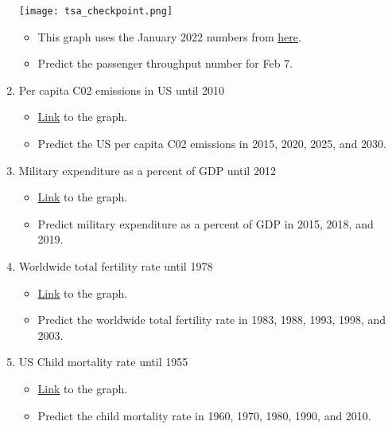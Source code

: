 \documentclass[11pt]{article}
\begin{document}
\begin{enumerate}
	\begin{center}	
		\texttt{[image: tsa\_checkpoint.png]}
	\end{center}

	\begin{itemize}
		\item This graph uses the January 2022 numbers from \href{https://www.tsa.gov/coronavirus/passenger-throughput}{here}.
		\item Predict the passenger throughput number for Feb 7.
	\end{itemize}
	
	\item Per capita C02 emissions in US until 2010
	\begin{itemize}
		\item \href{https://ourworldindata.org/grapher/co-emissions-per-capita?tab=chart&time=1750..2010&country=~USA}{Link} to the graph.
		\item Predict the US per capita C02 emissions in 2015, 2020, 2025, and 2030.
	\end{itemize}
	
	\item Military expenditure as a percent of GDP until 2012
	\begin{itemize}
		\item \href{https://ourworldindata.org/grapher/military-expenditure-share-gdp-sipri?time=earliest..2012&country=~USA}{Link} to the graph.
		\item Predict military expenditure as a percent of GDP in 2015, 2018, and 2019.
	\end{itemize}

	\item Worldwide total fertility rate until 1978
	\begin{itemize}
		\item \href{https://ourworldindata.org/grapher/children-per-woman-UN?tab=chart&time=1950..1978}{Link} to the graph.
		\item Predict the worldwide total fertility rate in 1983, 1988, 1993, 1998, and 2003.
	\end{itemize}
	
	\item US Child mortality rate until 1955
	\begin{itemize}
		\item \href{https://ourworldindata.org/grapher/child-mortality?time=earliest..1955&country=~USA}{Link} to the graph.
		\item Predict the child mortality rate in 1960, 1970, 1980, 1990, and 2010.
	\end{itemize}
\end{enumerate}
\end{document}
